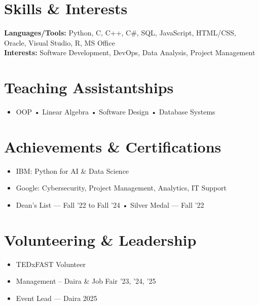 \documentclass[a4paper,9.5pt]{article}
\begin{document}
\vspace{-1mm}
\section*{Skills \& Interests}
\textbf{Languages/Tools:} Python, C, C++, C\#, SQL, JavaScript, HTML/CSS, Oracle, Visual Studio, R, MS Office \\
\textbf{Interests:} Software Development, DevOps, Data Analysis, Project Management

\vspace{-1mm}
\section*{Teaching Assistantships}
\begin{itemize}
    \item OOP \quad • \quad Linear Algebra \quad • \quad Software Design \quad • \quad Database Systems
\end{itemize}

\vspace{-1mm}
\section*{Achievements \& Certifications}
\begin{itemize}
    \item IBM: Python for AI \& Data Science
    \item Google: Cybersecurity, Project Management, Analytics, IT Support
    \item Dean’s List — Fall ’22 to Fall ’24 \quad • \quad Silver Medal — Fall ’22
\end{itemize}

\vspace{-1mm}
\section*{Volunteering \& Leadership}
\begin{itemize}
    \item TEDxFAST Volunteer
    \item Management – Daira \& Job Fair ’23, ’24, ’25
    \item Event Lead — Daira 2025
\end{itemize}
\end{document}
